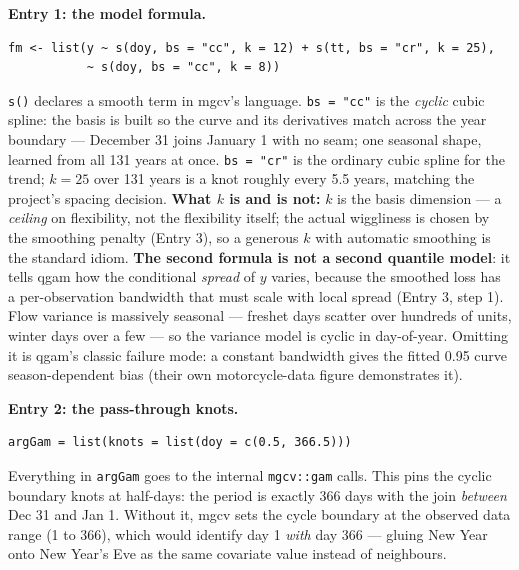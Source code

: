 \documentclass[11pt]{article}
\newcommand{\code}[1]{\texttt{#1}}
\begin{document}
\textbf{Entry 1: the model formula.}
\begin{Verbatim}[fontsize=\small]
fm <- list(y ~ s(doy, bs = "cc", k = 12) + s(tt, bs = "cr", k = 25),
           ~ s(doy, bs = "cc", k = 8))
\end{Verbatim}
\code{s()} declares a smooth term in mgcv's language. \code{bs = "cc"} is
the \emph{cyclic} cubic spline: the basis is built so the curve and its
derivatives match across the year boundary --- December 31 joins January 1
with no seam; one seasonal shape, learned from all 131 years at once.
\code{bs = "cr"} is the ordinary cubic spline for the trend; $k = 25$ over
131 years is a knot roughly every 5.5 years, matching the project's
spacing decision. \textbf{What $k$ is and is not:} $k$ is the basis
dimension --- a \emph{ceiling} on flexibility, not the flexibility itself;
the actual wiggliness is chosen by the smoothing penalty (Entry 3), so a
generous $k$ with automatic smoothing is the standard idiom. \textbf{The
second formula is not a second quantile model}: it tells qgam how the
conditional \emph{spread} of $y$ varies, because the smoothed loss has a
per-observation bandwidth that must scale with local spread (Entry 3, step
1). Flow variance is massively seasonal --- freshet days scatter over
hundreds of units, winter days over a few --- so the variance model is
cyclic in day-of-year. Omitting it is qgam's classic failure mode: a
constant bandwidth gives the fitted 0.95 curve season-dependent bias
(their own motorcycle-data figure demonstrates it).

\textbf{Entry 2: the pass-through knots.}
\begin{Verbatim}[fontsize=\small]
argGam = list(knots = list(doy = c(0.5, 366.5)))
\end{Verbatim}
Everything in \code{argGam} goes to the internal \code{mgcv::gam} calls.
This pins the cyclic boundary knots at half-days: the period is exactly 366
days with the join \emph{between} Dec 31 and Jan 1. Without it, mgcv sets
the cycle boundary at the observed data range (1 to 366), which would
identify day 1 \emph{with} day 366 --- gluing New Year onto New Year's Eve
as the same covariate value instead of neighbours.
\end{document}
